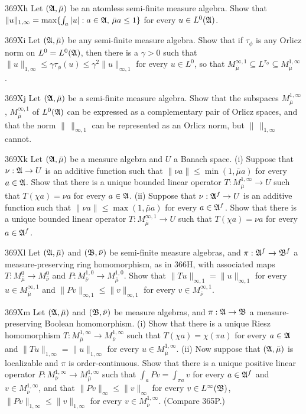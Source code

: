 {\spheader 369Xh Let $(\frak A,\bar\mu)$ be an atomless semi-finite
measure algebra.   Show that
$\|u\|_{1,\infty}=\max\{\int_a|u|:a\in\frak A,\,\bar\mu a\le 1\}$ for
every $u\in L^0(\frak A)$.   
     
\spheader 369Xi Let $(\frak A,\bar\mu)$ be any semi-finite measure
algebra.   Show that if $\tau_{\phi}$ is any Orlicz
norm on $L^0=L^0(\frak A)$, then there is a $\gamma>0$ such that
$\|u\|_{1,\infty}\le\gamma\tau_{\phi}(u)\le\gamma^2\|u\|_{\infty,1}$ for
every $u\in L^0$, so that
$M^{\infty,1}_{\bar\mu}\subseteq L^{\tau_{\phi}}
\subseteq M^{1,\infty}_{\bar\mu}$.
     
\spheader 369Xj Let $(\frak A,\bar\mu)$ be a semi-finite measure
algebra.   Show that the subspaces $M^{1,\infty}_{\bar\mu}$,
$M^{\infty,1}_{\bar\mu}$ of $L^0(\frak A)$ can be expressed as a
complementary pair
of Orlicz spaces, and that the norm $\|\,\|_{\infty,1}$ can be
represented as an Orlicz norm, but $\|\,\|_{1,\infty}$ cannot.
     
\sqheader 369Xk Let $(\frak A,\bar\mu)$ be a measure algebra and $U$ a
Banach space.   (i) Suppose that $\nu:\frak A\to U$ is an additive
function such that $\|\nu a\|\le\min(1,\bar\mu a)$ for every $a\in\frak
A$.   Show that there is a unique bounded linear operator
$T:M^{1,\infty}_{\bar\mu}\to U$ such that $T(\chi a)=\nu a$ for
every $a\in\frak A$.   (ii) Suppose that $\nu:\frak A^f\to U$ is an
additive function such that $\|\nu a\|\le\max(1,\bar\mu a)$ for every
$a\in\frak A^f$.   Show that there is a unique bounded linear operator
$T:M^{\infty,1}_{\bar\mu}\to U$ such that $T(\chi a)=\nu a$ for
every $a\in\frak A^f$.
     
\spheader 369Xl Let $(\frak A,\bar\mu)$ and $(\frak B,\bar\nu)$ be
semi-finite measure algebras, and $\pi:\frak A^f\to\frak B^f$ a
measure-preserving ring homomorphism, as in 366H, with associated maps
$T:M^0_{\bar\mu}\to M^0_{\bar\nu}$ and
$P:M^{1,0}_{\bar\nu}\to M^{1,0}_{\bar\mu}$.   Show that 
$\|Tu\|_{\infty,1}=\|u\|_{\infty,1}$ for every 
$u\in M^{\infty,1}_{\bar\mu}$ and $\|Pv\|_{\infty,1}\le\|v\|_{\infty,1}$ 
for every $v\in M^{\infty,1}_{\bar\nu}$.
     
\spheader 369Xm Let $(\frak A,\bar\mu)$ and $(\frak B,\bar\nu)$ be
measure algebras, and $\pi:\frak A\to\frak B$ a measure-preserving
Boolean homomorphism.   (i) Show that there is a unique Riesz
homomorphism $T:M^{1,\infty}_{\bar\mu}\to M^{1,\infty}_{\bar\nu}$ such
that $T(\chi a)=\chi(\pi a)$ for every $a\in\frak A$
and $\|Tu\|_{1,\infty}=\|u\|_{1,\infty}$ for every 
$u\in M^{1,\infty}_{\bar\mu}$.   (ii) Now suppose that 
$(\frak A,\bar\mu)$ is localizable and $\pi$ is order-continuous.   
Show that there is a unique positive linear operator 
$P:M^{1,\infty}_{\bar\nu}\to M^{1,\infty}_{\bar\mu}$ such that
$\int_aPv=\int_{\pi a}v$ for every $a\in\frak A^f$ and
$v\in M^{1,\infty}_{\bar\nu}$, and that
$\|Pv\|_{\infty}\le\|v\|_{\infty}$ for every 
$v\in L^{\infty}(\frak B)$, %
$\|Pv\|_{1,\infty}\le\|v\|_{1,\infty}$ for
every $v\in M^{1,\infty}_{\bar\nu}$.   (Compare 365P.)
     
}
